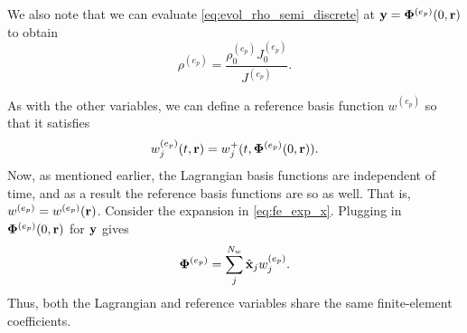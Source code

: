 \documentclass[11pt]{report}
\begin{document}
We also note that we can evaluate \cref{eq:evol_rho_semi_discrete} at $\mathbf{y} = \bm \Phi^{(e_p)}(0,\mathbf{r})$ to obtain
\begin{equation}
    \rho^{(e_p)} = \frac{\rho^{(e_p)}_0 J^{(e_p)}_0}{J^{(e_p)}}.
\end{equation}

As with the other variables, we can define a reference basis function $w^{(e_p)}$ so that it satisfies
\begin{equation}
    w_j^{(e_p)}(t,\mathbf{r}) = w_j^+(t,\bm \Phi^{(e_p)}(0,\mathbf{r})).
\end{equation}
Now, as mentioned earlier, the Lagrangian basis functions are independent of time, and as a result the reference basis functions are so as well. That is, $w^{(e_p)} = w^{(e_p)}(\mathbf{r})$. Consider the expansion in \cref{eq:fe_exp_x}. Plugging in $\bm \Phi^{(e_p)}(0,\mathbf{r})$ for $\mathbf{y}$ gives
\begin{equation}
    \label{eq:re_exp_x}
    \bm \Phi^{(e_p)} = \sum_j^{N_w} \hat{\mathbf{x}}_j w^{(e_p)}_j.
\end{equation}
Thus, both the Lagrangian and reference variables share the same finite-element coefficients.

\end{document}
